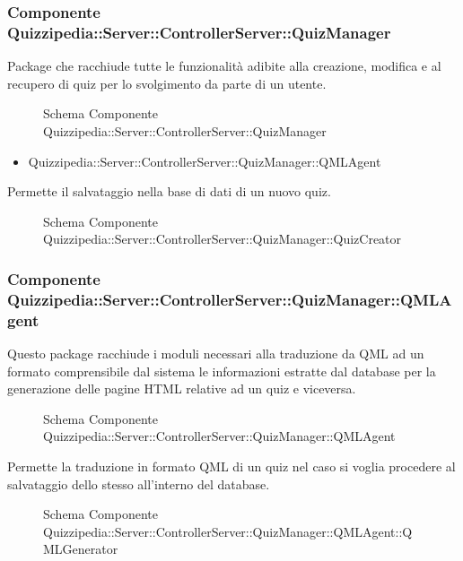\subsubsection{Componente Quizzipedia::Server::ControllerServer::QuizManager}
Package che racchiude tutte le funzionalità adibite alla creazione, modifica e al recupero di quiz per lo svolgimento da parte di un utente.
\begin{figure}[H]
\centering
\noindent{}
\caption{Schema Componente Quizzipedia::Server::ControllerServer::QuizManager}
\end{figure}
\begin{itemize}
\item Quizzipedia::Server::ControllerServer::QuizManager::QMLAgent
\end{itemize}
Permette il salvataggio nella base di dati di un nuovo quiz.
\begin{figure}[H]
\centering
\noindent{}
\caption{Schema Componente Quizzipedia::Server::ControllerServer::QuizManager::QuizCreator}
\end{figure}
\subsubsection{Componente Quizzipedia::Server::ControllerServer::QuizManager::QMLAgent}
Questo package racchiude i moduli necessari alla traduzione da QML ad un formato comprensibile dal sistema le informazioni estratte dal database per la generazione delle pagine HTML relative ad un quiz e viceversa.
\begin{figure}[H]
\centering
\noindent{}
\caption{Schema Componente Quizzipedia::Server::ControllerServer::QuizManager::QMLAgent}
\end{figure}
Permette la traduzione in formato QML di un quiz nel caso si voglia procedere al salvataggio dello stesso all'interno del database.
\begin{figure}[H]
\centering
\noindent{}
\caption{Schema Componente Quizzipedia::Server::ControllerServer::QuizManager::QMLAgent::QMLGenerator}
\end{figure}
